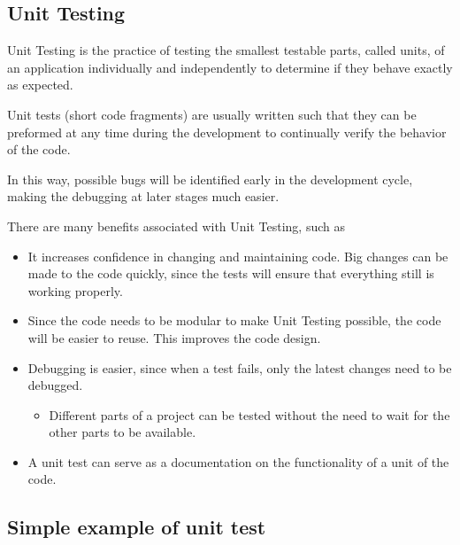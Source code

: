 \documentclass[%
oneside,                 %
final,                   %
10pt]{article}
\begin{document}
\subsection*{Unit Testing}

Unit Testing is the practice of testing the smallest testable parts,
called units, of an application individually and independently to
determine if they behave exactly as expected. 

Unit tests (short code
fragments) are usually written such that they can be preformed at any
time during the development to continually verify the behavior of the
code. 

In this way, possible bugs will be identified early in the
development cycle, making the debugging at later stages much
easier. 

There are many benefits associated with Unit Testing, such as
\begin{itemize}
  \item It increases confidence in changing and maintaining code. Big changes can be made to the code quickly, since the tests will ensure that everything still is working properly.

  \item Since the code needs to be modular to make Unit Testing possible, the code will be easier to reuse. This improves the code design.

  \item Debugging is easier, since when a test fails, only the latest changes need to be debugged.
\begin{itemize}

   \item Different parts of a project can be tested without the need to wait for the other parts to be available.

\end{itemize}

\noindent
  \item A unit test can serve as a documentation on the functionality of a unit of the code.
\end{itemize}

\noindent
\subsection*{Simple example of unit test}
\end{document}
